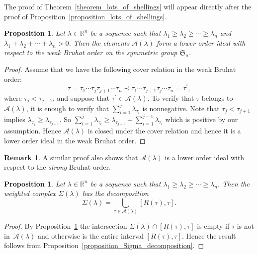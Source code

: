 \documentclass[10pt]{amsart}
\newtheorem{prop}[theorem]{Proposition}
\theoremstyle{definition}
\newtheorem{remark}[theorem]{Remark}
\newcommand{\Rrr}{\mathbb{R}}
\newcommand{\Sym}{\mathfrak{S}}
\newcommand{\coveredby}{\prec}
\newcommand{\lambdaweaklydecreasing}
{\lambda_{1} \geq \lambda_{2} \geq \cdots \geq \lambda_{n}}
\newcommand{\lambdasumpositive}
{\lambda_{1} + \lambda_{2} + \cdots + \lambda_{n} > 0}
\begin{document}
The proof of Theorem~\ref{theorem_lots_of_shellings}
will appear directly
after the proof of Proposition~\ref{proposition_lots_of_shellings}.



\begin{prop}
Let $\lambda \in \Rrr^{n}$ be a sequence such that
$\lambdaweaklydecreasing$ and
$\lambdasumpositive$.
Then the elements $\mathcal{A}(\lambda)$
form a lower order ideal with respect to the weak Bruhat order
on the symmetric group $\Sym_{n}$.
\label{proposition_A_lambda}
\end{prop}
\begin{proof}
Assume that
we have the following cover relation in the
weak Bruhat order:
$$
\tau
= 
\tau_{1} \cdots \tau_{j} \tau_{j+1} \cdots \tau_{n}
\coveredby
\tau_{1} \cdots \tau_{j+1} \tau_{j} \cdots \tau_{n}=\tau^{\prime}, $$
where 
$\tau_{j} < \tau_{j+1}$, and suppose that $\tau^{\prime}\in\mathcal{A}(\lambda)$.
To verify that $\tau$ belongs to $\mathcal{A}(\lambda)$,
it is enough to verify that
$\sum_{i=1}^{j} \lambda_{\tau_{i}}$ is nonnegative.
Note that
$\tau_{j} < \tau_{j+1}$
implies
$\lambda_{\tau_{j}} \geq \lambda_{\tau_{j+1}}$.
So
$\sum_{i=1}^{j} \lambda_{\tau_{i}}
\geq
\lambda_{\tau_{j+1}}
+
\sum_{i=1}^{j-1} \lambda_{\tau_{i}}$
which is positive by our assumption.
Hence
$\mathcal{A}(\lambda)$ is closed under the cover relation and
hence it is a lower order ideal in the weak Bruhat order.
\end{proof}

\begin{remark}
{\rm
A similar proof also shows that $\mathcal{A}(\lambda)$ is a
lower order ideal with respect to the \emph{strong} Bruhat order.
}
\end{remark}

\begin{prop}
Let $\lambda \in \Rrr^{n}$ be a sequence such that
$\lambdaweaklydecreasing$.
Then the weighted complex $\Sigma(\lambda)$
has the decomposition
$$ \Sigma(\lambda) = \bigcup_{\tau \in \mathcal{A}(\lambda)} [R(\tau), \tau] . $$
\label{proposition_Sigma_lambda_decomposition}
\end{prop}
\begin{proof}
By Proposition~\ref{proposition_A_lambda}
the intersection $\Sigma(\lambda) \cap [R(\tau),\tau]$
is empty if $\tau$ is not in~$\mathcal{A}(\lambda)$
and otherwise is the entire interval $[R(\tau), \tau]$.
Hence the result follows from
Proposition~\ref{proposition_Sigma_decomposition}.
\end{proof}
\end{document}
